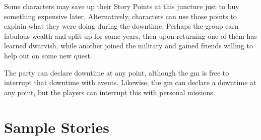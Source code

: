 \begin{multicols}{2}
Some characters may save up their Story Points at this juncture just to buy something expensive later.  Alternatively, characters can use those points to explain what they were doing during the \gls{downtime}.  Perhaps the group earn fabulous wealth and split up for some years, then upon returning one of them has learned dwarvish, while another joined the military and gained friends willing to help out on some new quest.

The party can declare \gls{downtime} at any point, although the \gls{gm} is free to interrupt that \gls{downtime} with events.
Likewise, the \gls{gm} can declare a \gls{downtime} at any point, but the players can interrupt this with personal missions.

\end{multicols}

\section{Sample Stories}

